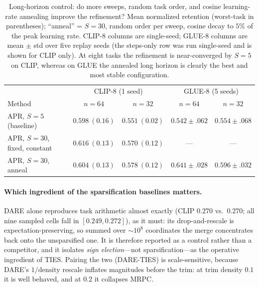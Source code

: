 \documentclass[11pt]{article}
\begin{document}
\begin{table}[t]
\centering
\small
\caption{Long-horizon control: do more sweeps, random task order, and cosine learning-rate annealing improve the refinement? Mean normalized retention (worst-task in parentheses); ``anneal'' = $S{=}30$, random order per sweep, cosine decay to $5\%$ of the peak learning rate. CLIP-8 columns are single-seed; GLUE-8 columns are mean $\pm$ std over five replay seeds (the steps-only row was run single-seed and is shown for CLIP only). At eight tasks the refinement is near-converged by $S{=}5$ on CLIP, whereas on GLUE the annealed long horizon is clearly the best and most stable configuration.}
\label{tab:longapr}
\begin{tabular}{lcccc}
\toprule
 & \multicolumn{2}{c}{CLIP-8 (1 seed)} & \multicolumn{2}{c}{GLUE-8 (5 seeds)} \\
Method & $n{=}64$ & $n{=}32$ & $n{=}64$ & $n{=}32$ \\
\midrule
APR, $S{=}5$ (baseline)        & $0.598\ (0.16)$ & $0.551\ (0.02)$ & $0.542\pm.062$ & $0.554\pm.068$ \\
APR, $S{=}30$, fixed, constant & $\mathbf{0.616}\ (0.13)$ & $0.570\ (0.12)$ & --- & --- \\
APR, $S{=}30$, anneal          & $0.604\ (0.13)$ & $\mathbf{0.578}\ (0.12)$ & $\mathbf{0.641\pm.028}$ & $\mathbf{0.596\pm.032}$ \\
\bottomrule
\end{tabular}
\end{table}

\paragraph{Which ingredient of the sparsification baselines matters.}
DARE alone reproduces task arithmetic almost exactly (CLIP $0.270$ vs.\ $0.270$; all nine sampled cells fall in $[0.249,0.272]$), as it must: its drop-and-rescale is expectation-preserving, so summed over $\sim\!10^8$ coordinates the merge concentrates back onto the unsparsified one. It is therefore reported as a control rather than a competitor, and it isolates \emph{sign election}---not sparsification---as the operative ingredient of TIES. Pairing the two (DARE-TIES) is scale-sensitive, because DARE's $1/\text{density}$ rescale inflates magnitudes before the trim: at trim density $0.1$ it is well behaved, and at $0.2$ it collapses MRPC.
\end{document}
